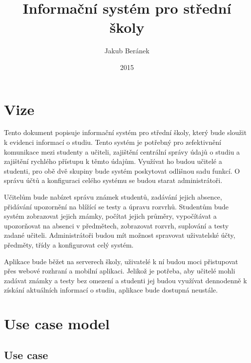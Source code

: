 \documentclass[a4paper,10pt]{article}
\title{Informační systém pro střední školy} %
\author{Jakub Beránek} %
\date{2015} %
\begin{document}
	\maketitle
	
	\section{Vize}
	Tento dokument popisuje informační systém pro střední školy, který bude sloužit k evidenci informací o studiu.
	Tento systém je potřebný pro zefektivnění komunikace mezi studenty a učiteli, zajištění centrální správy
	údajů o studiu a zajištění rychlého přístupu k těmto údajům.
	Využívat ho budou učitelé a studenti, pro obě dvě skupiny bude systém poskytovat odlišnou sadu funkcí.
	O správu účtů a konfiguraci celého systému se budou starat administrátoři.
	
	\vspace{5mm} %
	
	Učitelům bude nabízet správu známek studentů, zadávání jejich absence, přidávání upozornění na blížící se testy a úpravu rozvrhů.
	Studentům bude systém zobrazovat jejich známky, počítat jejich průměry, vypočítávat a upozorňovat na absenci v předmětech,
	zobrazovat rozvrh, suplování a testy zadané učiteli. Administrátoři budou mít možnost spravovat uživatelské účty, předměty, třídy a konfigurovat
	celý systém.
	
	\vspace{5mm} %
	
	Aplikace bude běžet na serverech školy, uživatelé k ní budou moci přistupovat přes webové rozhraní a mobilní aplikaci.
	Jelikož je potřeba, aby učitelé mohli zadávat známky a testy bez omezení a studenti jej budou využívat dennodenně k získání
	aktuálních informací o studiu, aplikace bude dostupná neustále.
	
	\section{Use case model}
	\subsection{Use case}
\end{document}
